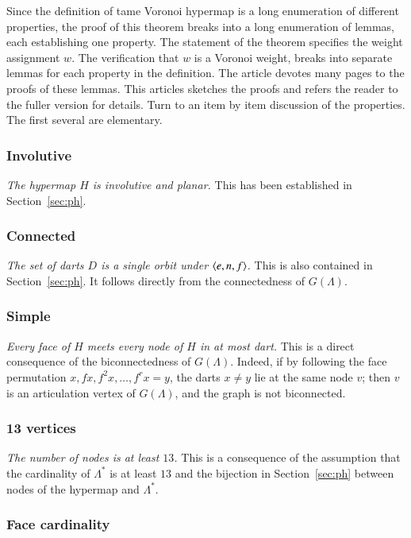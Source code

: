 \documentclass{article} %
\begin{document}
Since the definition of tame Voronoi hypermap is a long enumeration of
different properties, the proof of this theorem breaks into a long
enumeration of lemmas, each establishing one property. The statement
of the theorem specifies the weight assignment $w$. The verification
that $w$ is a Voronoi weight, breaks into separate lemmas for each
property in the definition. The article \cite{Hales:2002:Dodec}
devotes many pages to the proofs of these lemmas. This articles
sketches the proofs and refers the reader to the fuller version for
details. Turn to an item by item discussion of the properties. The
first several are elementary.

\subsubsection{Involutive}
{\it The hypermap $H$ is involutive and planar.}  This has been established in Section~\ref{sec:ph}.


\subsubsection{Connected}
{\it The set of darts $D$  is a single orbit under $\langle e,n,f\rangle$.}  This is also
contained in Section~\ref{sec:ph}. It follows directly from the
connectedness of $G(\Lambda)$.

\subsubsection{Simple}

{\it Every face of $H$ meets every node of $H$ in at most
dart.}  This is a direct consequence of the biconnectedness of $G(\Lambda)$.
Indeed, if by following the face permutation $x,f x, f^2 x,\ldots, f^r x= y$,
the darts $x\ne y$ lie at the same node $v$; then $v$ is an articulation vertex
of $G(\Lambda)$, and the graph is not biconnected.

\subsubsection{13 vertices}

{\it The number of nodes is at least $13$.}  This is a consequence of the assumption
that the cardinality of $\Lambda^*$ is at least $13$ and the bijection in
Section~\ref{sec:ph} between nodes of the hypermap and $\Lambda^*$.

\subsubsection{Face cardinality}\label{sec:face}
\end{document}
